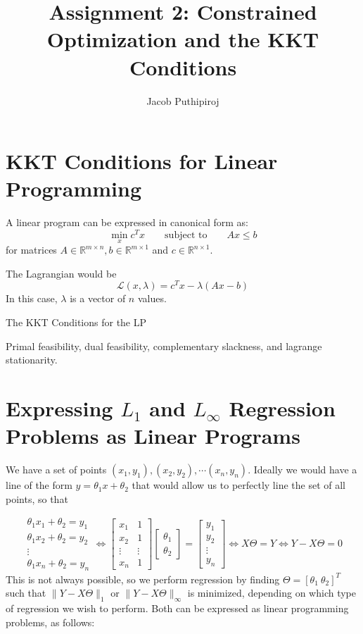 \documentclass{article}
\begin{document}
\title{Assignment 2: Constrained Optimization and the KKT Conditions}
\author{Jacob Puthipiroj}
\maketitle

\section*{KKT Conditions for Linear Programming}


A linear program can be expressed in canonical form as:
$$ \min_x c^Tx \qquad \text{subject to} \qquad Ax \leq b$$
for matrices $A \in \mathbb{R}^{m \times n}, b \in \mathbb{R}^{m \times 1}$ and $c \in \mathbb{R}^{n \times 1}$.

The Lagrangian would be $$ \mathcal{L}(x,\lambda) = c^Tx - \lambda(Ax-b) $$
In this case, $\lambda$ is a vector of $n$ values. 

The KKT Conditions for the LP


Primal feasibility, dual feasibility, complementary slackness, and lagrange stationarity.
\section*{Expressing $L_1$ and $L_\infty$ Regression Problems as Linear Programs}
We have a set of points $(x_1, y_1), (x_2, y_2), \cdots (x_n, y_n)$. Ideally we would have a line of the form $y = \theta_1 x + \theta_2$ that would allow us to perfectly line the set of all points, so that 



$$ \begin{matrix} \theta_1  x_1 +\theta_2 = y_1 \\ \theta_1x_2+\theta_2 = y_2 \\ \vdots \\ \theta_1x_n + \theta_2 = y_n\end{matrix} \iff \begin{bmatrix} x_1 & 1 \\ x_2 & 1 \\ \vdots & \vdots \\ x_n & 1 \end{bmatrix} \begin{bmatrix} \theta_1 \\ \theta_2 \end{bmatrix}  = \begin{bmatrix} y_1 \\ y_2 \\ \vdots \\ y_n\end{bmatrix} \iff X\Theta =Y \iff Y-X\Theta = 0$$
This is not always possible, so we perform regression by finding $\Theta = [\theta_1 \ \theta_2]^T$ such that $\lVert Y-X\Theta  \rVert_1$  or $\lVert Y-X\Theta  \rVert_\infty $ is minimized, depending on which type of regression we wish to perform. Both can be expressed as linear programming problems, as follows:\\
\end{document}

